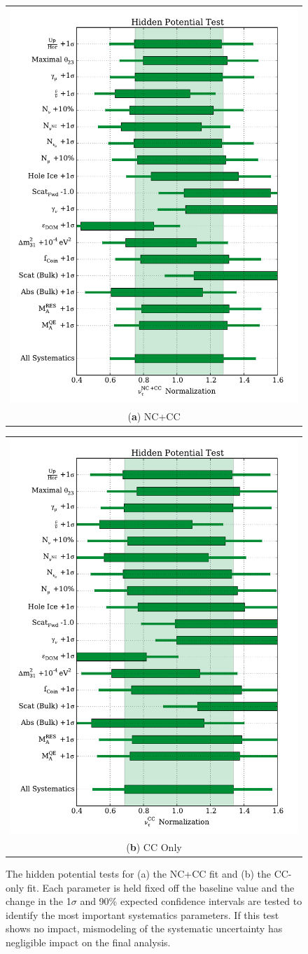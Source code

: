 \begin{figure}[h]
\centering
\begin{tabular}[b]{c}
  \includegraphics[width=0.45\linewidth]{hidden_widths_nc_cc.pdf} \\
  \small (\textbf{\color{ctcolormain}a}) NC+CC
\end{tabular} \hspace{2pt}
\begin{tabular}[b]{c}
  \includegraphics[width=0.45\linewidth]{hidden_widths_cc.pdf} \\
  \small (\textbf{\color{ctcolormain}b}) CC Only
\end{tabular}
\caption[The hidden potential tests]{The hidden potential tests for (a) the NC+CC fit and (b) the CC-only fit. Each parameter is held fixed off the baseline value and the change in the 1$\sigma$ and 90\% expected confidence intervals are tested to identify the most important systematics parameters. If this test shows no impact, mismodeling of the systematic uncertainty has negligible impact on the final analysis.}
\label{fig:hidden_tests}
\end{figure}








